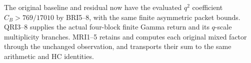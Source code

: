 The original baseline and residual now have the evaluated
$q^2$ coefficient $C_B>769/17010$ by BRI5--8, with the same
finite asymmetric packet bounds. QRI3--8 supplies the actual
four-block finite Gamma return and its $q$-scale multiplicity
branches. MRI1--5 retains and computes each original mixed
factor through the unchanged observation, and transports their
sum to the same arithmetic and HC identities.